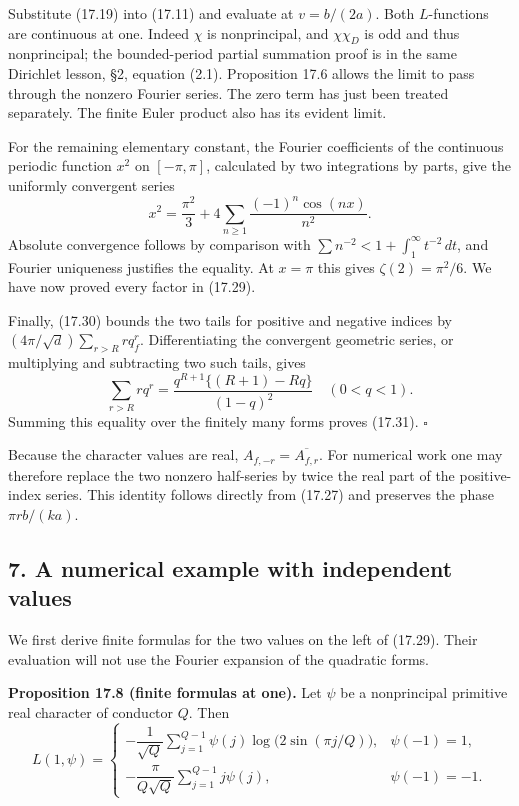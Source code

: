 \documentclass[
  11pt,
  a4paper,
]{article}
\begin{document}
Substitute (17.19) into (17.11) and evaluate at \(v=b/(2a)\). Both
\(L\)-functions are continuous at one. Indeed \(\chi\) is nonprincipal,
and \(\chi\chi_D\) is odd and thus nonprincipal; the bounded-period
partial summation proof is in the same Dirichlet lesson, §2, equation
(2.1). Proposition 17.6 allows the limit to pass through the nonzero
Fourier series. The zero term has just been treated separately. The
finite Euler product also has its evident limit.

For the remaining elementary constant, the Fourier coefficients of the
continuous periodic function \(x^2\) on \([-\pi,\pi]\), calculated by
two integrations by parts, give the uniformly convergent series \[
 x^2=\frac{\pi^2}{3}
       +4\sum_{n\ge1}\frac{(-1)^n\cos(nx)}{n^2}.
\] Absolute convergence follows by comparison with
\(\sum n^{-2}<1+\int_1^\infty t^{-2}\,dt\), and Fourier uniqueness
justifies the equality. At \(x=\pi\) this gives \(\zeta(2)=\pi^2/6\). We
have now proved every factor in (17.29).

Finally, (17.30) bounds the two tails for positive and negative indices
by \((4\pi/\sqrt d)\sum_{r>R}r q_f^r\). Differentiating the convergent
geometric series, or multiplying and subtracting two such tails, gives
\[
 \sum_{r>R}r q^r
 =\frac{q^{R+1}\{(R+1)-Rq\}}{(1-q)^2}\quad(0<q<1).
\] Summing this equality over the finitely many forms proves (17.31).
\(\square\)

Because the character values are real, \(A_{f,-r}=\overline{A_{f,r}}\).
For numerical work one may therefore replace the two nonzero half-series
by twice the real part of the positive-index series. This identity
follows directly from (17.27) and preserves the phase \(\pi rb/(ka)\).

\subsection{7. A numerical example with independent
values}\label{a-numerical-example-with-independent-values}

We first derive finite formulas for the two values on the left of
(17.29). Their evaluation will not use the Fourier expansion of the
quadratic forms.

\textbf{Proposition 17.8 (finite formulas at one).} Let \(\psi\) be a
nonprincipal primitive real character of conductor \(Q\). Then \[
 L(1,\psi)=
 \begin{cases}
 -\dfrac1{\sqrt Q}\displaystyle\sum_{j=1}^{Q-1}
       \psi(j)\log\bigl(2\sin(\pi j/Q)\bigr),&\psi(-1)=1,\\[6pt]
 -\dfrac{\pi}{Q\sqrt Q}\displaystyle\sum_{j=1}^{Q-1}j\psi(j),
       &\psi(-1)=-1.
 \end{cases}
 \tag{17.32}
\]
\end{document}
